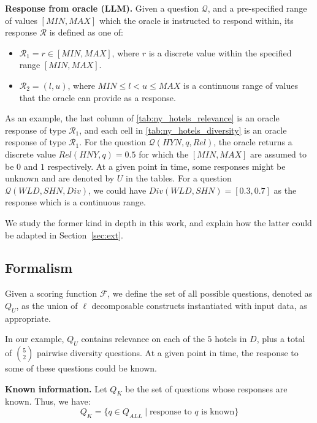 \noindent \textbf{Response from oracle (LLM).} Given a question \( \mathcal{Q} \), and a pre-specified range of values \([MIN,MAX]\) which the oracle is instructed to respond within, its response \( \mathcal{R} \) is defined as one of:
\begin{itemize}
    \item \( \mathcal{R}_1 = r \in [MIN,MAX] \), where \( r \) is a discrete value within the specified range \([MIN, MAX]\).
    \item \( \mathcal{R}_2 = (l,u) \), where \( MIN \leq l < u \leq MAX \) is a continuous range of values that the oracle can provide as a response.
\end{itemize}

As an example, the last column of \autoref{tab:ny_hotels_relevance} is an oracle response of type $\mathcal{R}_1$, and each cell in \autoref{tab:ny_hotels_diversity} is an oracle response of type $\mathcal{R}_1$. For the question $\mathcal{Q}(HYN,q,Rel)$, the oracle returns a discrete value $Rel(HNY,q) = 0.5$ for which the $[MIN,MAX]$ are assumed to be $0$ and $1$ respectively. At a given point in time, some responses might be unknown and are denoted by $U$ in the tables. For a question $\mathcal{Q}(WLD,SHN,Div)$, we could have $Div(WLD,SHN) = [0.3,0.7]$ as the response which is a continuous range. 

We study the former kind in depth in this work, and explain how the latter could be adapted in Section~\ref{sec:ext}.


\subsection{Formalism}
Given a scoring function $\mathcal{F}$, we define the set of all possible questions, denoted as \( Q_U \), as the union of $\ell$ decomposable constructs instantiated with input data, as appropriate.

In our example,  \( Q_U \) contains relevance on each of the $5$ hotels in $D$, plus a total of $\binom{5}{2}$ pairwise diversity questions. At a given point in time, the response to some of these questions could be known. 

\textbf{Known information.} Let \( Q_K \) be the set of questions whose responses are known. Thus, we have:
\[
Q_K = \{ q \in Q_{ALL} \mid \text{response to } q \text{ is known} \}
\]

